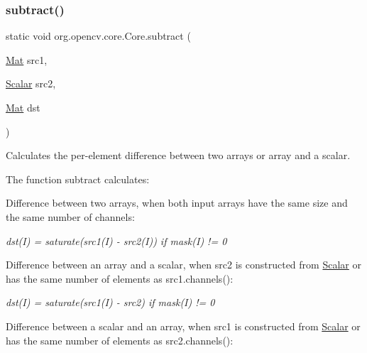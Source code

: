 \subsubsection{\texorpdfstring{subtract()}{subtract()}\hspace{0.1cm}{\footnotesize\ttfamily [6/6]}}
{\footnotesize\ttfamily static void org.\+opencv.\+core.\+Core.\+subtract (\begin{DoxyParamCaption}\item[{\mbox{\hyperlink{classorg_1_1opencv_1_1core_1_1_mat}{Mat}}}]{src1,  }\item[{\mbox{\hyperlink{classorg_1_1opencv_1_1core_1_1_scalar}{Scalar}}}]{src2,  }\item[{\mbox{\hyperlink{classorg_1_1opencv_1_1core_1_1_mat}{Mat}}}]{dst }\end{DoxyParamCaption})\hspace{0.3cm}{\ttfamily [static]}}

Calculates the per-\/element difference between two arrays or array and a scalar.

The function {\ttfamily subtract} calculates\+:


\begin{DoxyItemize}
\item Difference between two arrays, when both input arrays have the same size and the same number of channels\+: 
\end{DoxyItemize}

{\itshape dst(\+I) = saturate(src1(\+I) -\/ src2(\+I)) if mask(\+I) != 0}


\begin{DoxyItemize}
\item Difference between an array and a scalar, when {\ttfamily src2} is constructed from {\ttfamily \mbox{\hyperlink{classorg_1_1opencv_1_1core_1_1_scalar}{Scalar}}} or has the same number of elements as {\ttfamily src1.\+channels()}\+: 
\end{DoxyItemize}

{\itshape dst(\+I) = saturate(src1(\+I) -\/ src2) if mask(\+I) != 0}


\begin{DoxyItemize}
\item Difference between a scalar and an array, when {\ttfamily src1} is constructed from {\ttfamily \mbox{\hyperlink{classorg_1_1opencv_1_1core_1_1_scalar}{Scalar}}} or has the same number of elements as {\ttfamily src2.\+channels()}\+: 
\end{DoxyItemize}

